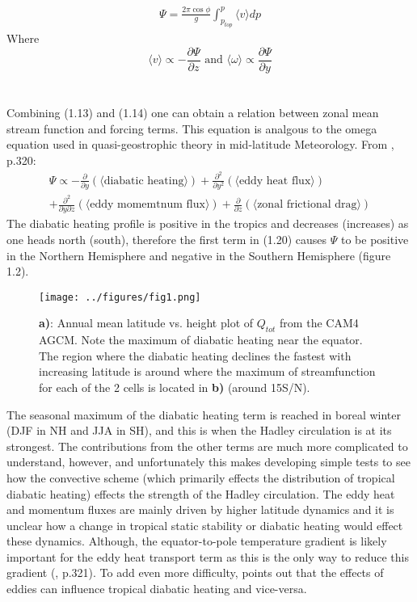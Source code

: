 \documentclass[letterpaper,12pt,titlepage,oneside,final]{book}
\begin{document}
\begin{align}
\Psi=\frac{2\pi\cos{\phi}}{g}\int_{p_{top}}^{p} \langle{v}\rangle{dp}
\end{align}
Where
\begin{equation}\label{eq:test}
\langle{v}\rangle \propto -\frac{\partial{\Psi}}{\partial{z}} \text{ and } \langle{\omega}\rangle \propto\frac{\partial{\Psi}}{\partial{y}}
\end{equation}
\\
\\
Combining (1.13) and (1.14) one can obtain a relation between zonal mean stream function and forcing terms. This equation is analgous to the omega equation used in quasi-geostrophic theory in mid-latitude Meteorology. From \cite{holton_introduction_2004}, p.320:
\begin{equation}
\begin{split}
\Psi \propto -\frac{\partial}{\partial{y}}(\langle\text{diabatic heating}\rangle) + \frac{\partial^{2}}{\partial{y^{2}}}(\langle\text{eddy heat flux}\rangle) \\ + \frac{\partial^{2}}{\partial{y}\partial{z}}(\langle\text{eddy momemtnum flux}\rangle) + \frac{\partial}{\partial{z}}(\langle\text{zonal frictional drag}\rangle) 
\end{split}
\end{equation}
The diabatic heating profile is positive in the tropics and decreases (increases) as one heads north (south), therefore the first term in (1.20) causes $\Psi$ to be positive in the Northern Hemisphere and negative in the Southern Hemisphere (figure 1.2).

\begin{figure}[H]
\centering
\noindent\texttt{[image: ../figures/fig1.png]}\hfill
\caption{\textbf{a)}: Annual mean latitude vs. height plot of $Q_{tot}$ from the CAM4 AGCM. Note the maximum of diabatic heating near the equator. The region where the diabatic heating declines the fastest with increasing latitude is around where the maximum of streamfunction for each of the 2 cells is located in \textbf{b)} (around 15S/N).}
\end{figure}

The seasonal maximum of the diabatic heating term is reached in boreal winter (DJF in NH and JJA in SH), and this is when the Hadley circulation is at its strongest. The contributions from the other terms are much more complicated to understand, however, and unfortunately this makes developing simple tests to see how the convective scheme (which primarily effects the distribution of tropical diabatic heating) effects the strength of the Hadley circulation. The eddy heat and momentum fluxes are mainly driven by higher latitude dynamics and it is unclear how a change in tropical static stability or diabatic heating would effect these dynamics. Although, the equator-to-pole temperature gradient is likely important for the eddy heat transport term as this is the only way to reduce this gradient (\cite{holton_introduction_2004}, p.321). To add even more difficulty, \cite{kim_hadley_2001} points out that the effects of eddies can influence tropical diabatic heating and vice-versa.
\end{document}
